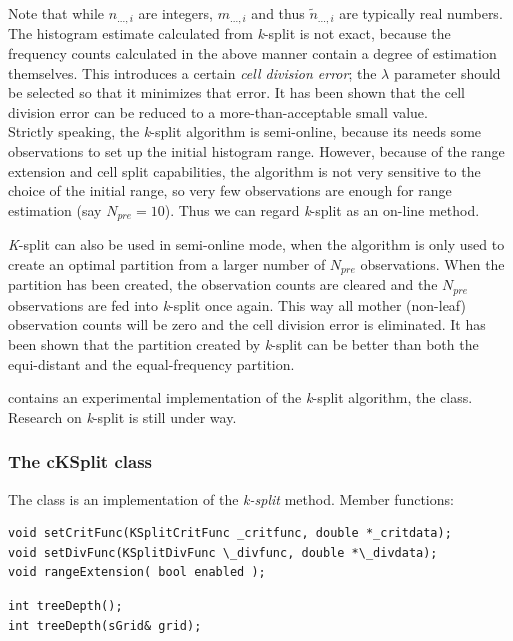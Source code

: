 Note that while $n_{...,i}$ are integers, $m_{...,i}$ and thus
$\tilde{n}_{...,i}$ are typically real numbers. The histogram estimate
calculated from \textit{k}-split is not exact, because the frequency
counts calculated in the above manner contain a degree of estimation
themselves. This introduces a certain \textit{cell division error};
the $\lambda$ parameter should be selected so that it minimizes that
error. It has been shown that the cell division error can
be reduced to a more-than-acceptable small value.\\
Strictly speaking, the \textit{k}-split algorithm is semi-online,
because its needs some observations to set up the initial histogram
range.  However, because of the range extension and cell split
capabilities, the algorithm is not very sensitive to the choice of the
initial range, so very few observations are enough for range
estimation (say $N_{pre}=10$). Thus we can regard \textit{k}-split as
an on-line method.

\textit{K}-split can also be used in semi-online mode, when the
algorithm is only used to create an optimal partition from a larger
number of $N_{pre}$ observations. When the partition has been created,
the observation counts are cleared and the $N_{pre}$ observations are
fed into \textit{k}-split once again. This way all mother (non-leaf)
observation counts will be zero and the cell division error is
eliminated. It has been shown that the partition created by
\textit{k}-split can be better than both the equi-distant and the
equal-frequency partition.


{\opp} contains an experimental implementation of the \textit{k}-split
algorithm, the  class. Research on \textit{k}-split is
still under way.


\subsubsection{The cKSplit class}

The  class is an implementation of the \textit{k-split} method.
Member functions:

%
%

\begin{verbatim}
void setCritFunc(KSplitCritFunc _critfunc, double *_critdata);
void setDivFunc(KSplitDivFunc \_divfunc, double *\_divdata);
void rangeExtension( bool enabled );
\end{verbatim}


\begin{verbatim}
int treeDepth();
int treeDepth(sGrid& grid);
\end{verbatim}


